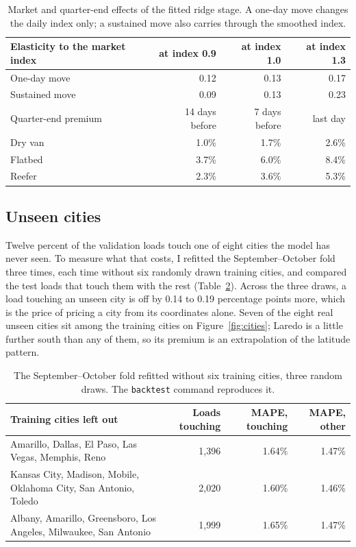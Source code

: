 \documentclass[11pt]{article}
\newcommand{\code}[1]{\texttt{#1}}
\begin{document}
\begin{table}[h]
\centering\small
\begin{tabular}{lrrr}
\toprule
Elasticity to the market index & at index 0.9 & at index 1.0 & at index 1.3 \\
\midrule
One-day move & 0.12 & 0.13 & 0.17 \\
Sustained move & 0.09 & 0.13 & 0.23 \\
\midrule
Quarter-end premium & 14 days before & 7 days before & last day \\
\midrule
Dry van & 1.0\% & 1.7\% & 2.6\% \\
Flatbed & 3.7\% & 6.0\% & 8.4\% \\
Reefer & 2.3\% & 3.6\% & 5.3\% \\
\bottomrule
\end{tabular}
\caption{Market and quarter-end effects of the fitted ridge stage. A one-day move changes the
daily index only; a sustained move also carries through the smoothed index.}
\label{tab:learned}
\end{table}

\subsection{Unseen cities}
\label{sec:unseen}

Twelve percent of the validation loads touch one of eight cities the model has never seen.
To measure what that costs, I refitted the September--October fold three times, each time
without six randomly drawn training cities, and compared the test loads that touch them with
the rest (Table~\ref{tab:unseen}). Across the three draws, a load touching an unseen city is
off by 0.14 to 0.19 percentage points more, which is the price of pricing a city from its
coordinates alone. Seven of the eight real unseen cities sit among the training cities on
Figure~\ref{fig:cities}; Laredo is a little further south than any of them, so its premium is
an extrapolation of the latitude pattern.

\begin{table}[h]
\centering\small
\begin{tabular}{p{7.2cm}rrr}
\toprule
Training cities left out & Loads touching & MAPE, touching & MAPE, other \\
\midrule
Amarillo, Dallas, El Paso, Las Vegas, Memphis, Reno & 1,396 & 1.64\% & 1.47\% \\
Kansas City, Madison, Mobile, Oklahoma City, San Antonio, Toledo & 2,020 & 1.60\% & 1.46\% \\
Albany, Amarillo, Greensboro, Los Angeles, Milwaukee, San Antonio & 1,999 & 1.65\% & 1.47\% \\
\bottomrule
\end{tabular}
\caption{The September--October fold refitted without six training cities, three random
draws. The \code{backtest} command reproduces it.}
\label{tab:unseen}
\end{table}
\end{document}
